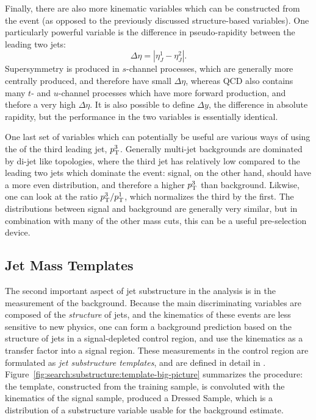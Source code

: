 Finally, there are also more kinematic variables which can be constructed from the event (as opposed to the previously discussed structure-based variables). One particularly powerful variable is the difference in pseudo-rapidity between the leading two jets:
%
\begin{equation}
\Delta \eta = |\eta_J^1 - \eta_J^2|.
\end{equation}
%
Supersymmetry is produced in $s$-channel processes, which are generally more centrally produced, and therefore have small $\Delta\eta$, whereas QCD also contains many $t$- and $u$-channel processes which have more forward production, and thefore a very high $\Delta\eta$. It is also possible to define $\Delta y$, the difference in absolute rapidity, but the performance in the two variables is essentially identical.

One last set of variables which can potentially be useful are various ways of using the \pt of the third leading jet, $p_{\text{T}}^3$. Generally multi-jet backgrounds are dominated by di-jet like topologies, where the third jet has relatively low \pt compared to the leading two jets which dominate the event: signal, on the other hand, should have a more even \pt distribution, and therefore a higher $p_{\text{T}}^3$ than background. Likwise, one can look at the ratio $p_{\text{T}}^3/p_{\text{T}}^1$, which normalizes the third \pt by the first. The \pt distributions between signal and background are generally very similar, but in combination with many of the other mass cuts, this can be a useful pre-selection device. 


\subsection{Jet Mass Templates}
	\label{chapter:search:substructure:templates}

The second important aspect of jet substructure in the analysis is in the measurement of the background. Because the main discriminating variables are composed of the \textit{structure} of jets, and the kinematics of these events are less sensitive to new physics, one can form a background prediction based on the structure of jets in a signal-depleted control region, and use the kinematics as a transfer factor into a signal region. These measurements in the control region are formulated as \textit{jet substructure templates}, and are defined in detail in \cite{MassTemplates}. Figure~\ref{fig:search:substructure:template-big-picture} summarizes the procedure: the template, constructed from the training sample, is convoluted with the kinematics of the signal sample, produced a Dressed Sample, which is a distribution of a substructure variable usable for the background estimate.


